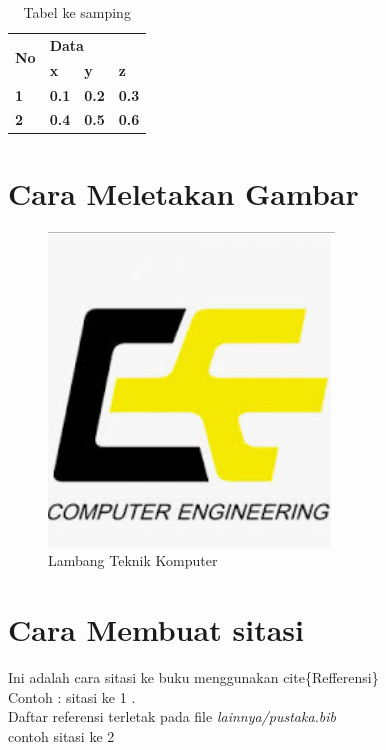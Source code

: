\begin{table}
	\centering
	\caption{Tabel ke samping}
	\begin{tabular}{|l|l|l|l|}
		\hline
		\multirow{2}{*}{\textbf{No}} & \multicolumn{3}{l|}{\textbf{Data}} \\ \cline{2-4} 
		& \textbf{x} & \textbf{y} & \textbf{z} \\ \hline
		\textbf{1} & \textbf{0.1} & \textbf{0.2} & \textbf{0.3} \\ \hline
		\textbf{2} & \textbf{0.4} & \textbf{0.5} & \textbf{0.6} \\ \hline
	\end{tabular}
	
\end{table}
\newpage
\section{Cara Meletakan Gambar}

\begin{figure}[H]
	\centering
	\includegraphics[width=0.5\linewidth]{bab2/LambangTeknikKOmputer}
	\caption{Lambang Teknik Komputer  }
	\label{fig:lambangteknikkomputer}
\end{figure}
\section{Cara Membuat  sitasi}

Ini adalah cara  sitasi ke buku menggunakan cite\{Refferensi\}\\

Contoh : sitasi ke 1
 \cite{Brathwaite2009}.\\
Daftar referensi terletak pada file 
\textit{lainnya/pustaka.bib}\\

contoh  sitasi ke 2
\cite{Friedman1997}
\newline
